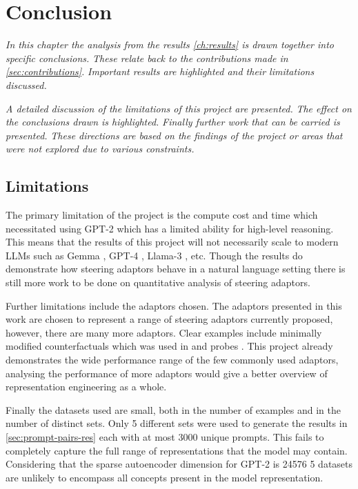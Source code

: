 \chapter{Conclusion}
\label{ch:conclusion}

\emph{In this chapter the analysis from the results \cref{ch:results} is drawn together into specific conclusions.}
\emph{These relate back to the contributions made in \cref{sec:contributions}.}
\emph{Important results are highlighted and their limitations discussed.}

\emph{A detailed discussion of the limitations of this project are presented.}
\emph{The effect on the conclusions drawn is highlighted.}
\emph{Finally further work that can be carried is presented.}
\emph{These directions are based on the findings of the project or areas that were not explored due to various constraints.}

\section{Limitations}

The primary limitation of the project is the compute cost and time which necessitated using GPT-2 which has a limited ability for high-level reasoning.
This means that the results of this project will not necessarily scale to modern LLMs such as Gemma \citep{gemma}, GPT-4 \citep{gpt-4}, Llama-3 \citep{llama3}, etc.
Though the results do demonstrate how steering adaptors behave in a natural language setting there is still more work to be done on quantitative analysis of steering adaptors.

Further limitations include the adaptors chosen.
The adaptors presented in this work are chosen to represent a range of steering adaptors currently proposed, however, there are many more adaptors.
Clear examples include minimally modified counterfactuals \citep{mimic} which was used in \citet{steering-clear} and probes \citep{probes}.
This project already demonstrates the wide performance range of the few commonly used adaptors, analysing the performance of more adaptors would give a better overview of representation engineering as a whole.

Finally the datasets used are small, both in the number of examples and in the number of distinct sets.
Only 5 different sets were used to generate the results in \cref{sec:prompt-pairs-res} each with at most 3000 unique prompts.
This fails to completely capture the full range of representations that the model may contain.
Considering that the sparse autoencoder dimension for GPT-2 is 24576 \citep{saelens} 5 datasets are unlikely to encompass all concepts present in the model representation.

